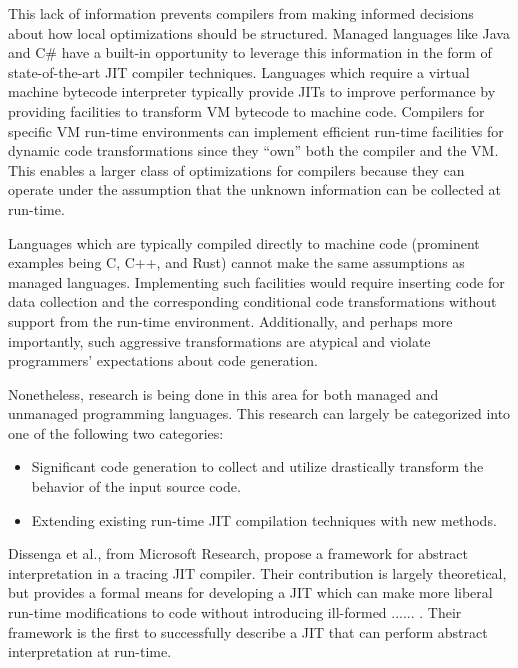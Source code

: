 \documentclass[nobib]{tufte-handout}
\makeatletter
\renewcommand{\subsubsection}{\ttl@straightclass{subsubsection}}
\newcommand{\csharp}{C\# }
\makeatother
\begin{document}
This lack of information prevents compilers from making informed decisions about how local optimizations should be structured.  Managed languages like Java and \csharp have a built-in opportunity to leverage this information in the form of state-of-the-art JIT compiler techniques.  Languages which require a virtual machine bytecode interpreter typically provide JITs to improve performance by providing facilities to transform VM bytecode to machine code.  Compilers for specific VM run-time environments can implement efficient run-time facilities for dynamic code transformations since they ``own'' both the compiler and the VM.  This enables a larger class of optimizations for compilers because they can operate under the assumption that the unknown information can be collected at run-time.

Languages which are typically compiled directly to machine code (prominent examples being C, C++, and Rust) cannot make the same assumptions as managed languages.  Implementing such facilities would require inserting code for data collection and the corresponding conditional code transformations without support from the run-time environment.  Additionally, and perhaps more importantly, such aggressive transformations are atypical and violate programmers' expectations about code generation.  

Nonetheless, research is being done in this area for both managed and unmanaged programming languages.  This research can largely be categorized into one of the following two categories:
\begin{itemize}
\item Significant code generation to collect and utilize drastically transform the behavior of the input source code.
\item Extending existing run-time JIT compilation techniques with new methods.
\end{itemize}

\subsubsection{Innovations in JIT Compilers}
Dissenga et al., from Microsoft Research, propose a framework for abstract interpretation in a tracing JIT compiler.  Their contribution is largely theoretical, but provides a formal means for developing a JIT which can make more liberal run-time modifications to code without introducing ill-formed ...... .  Their framework is the first to successfully describe a JIT that can perform abstract interpretation at run-time.  
\end{document}
